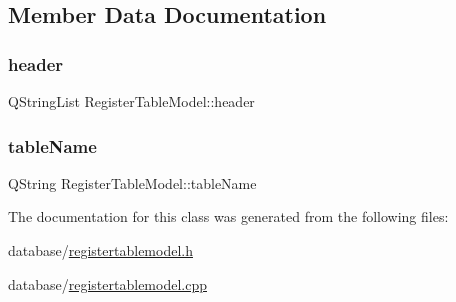 \subsection{Member Data Documentation}
\mbox{\label{class_register_table_model_a90768a3ec3a54146d4293997eecf2f0f}} 
\subsubsection{\texorpdfstring{header}{header}}
{\footnotesize\ttfamily Q\+String\+List Register\+Table\+Model\+::header\hspace{0.3cm}{\ttfamily [private]}}

\mbox{\label{class_register_table_model_acca0832c89723e301820c6c680ca60a3}} 
\subsubsection{\texorpdfstring{tableName}{tableName}}
{\footnotesize\ttfamily Q\+String Register\+Table\+Model\+::table\+Name\hspace{0.3cm}{\ttfamily [private]}}



The documentation for this class was generated from the following files\+:\begin{DoxyCompactItemize}
\item 
database/\mbox{\hyperlink{registertablemodel_8h}{registertablemodel.\+h}}\item 
database/\mbox{\hyperlink{registertablemodel_8cpp}{registertablemodel.\+cpp}}\end{DoxyCompactItemize}
